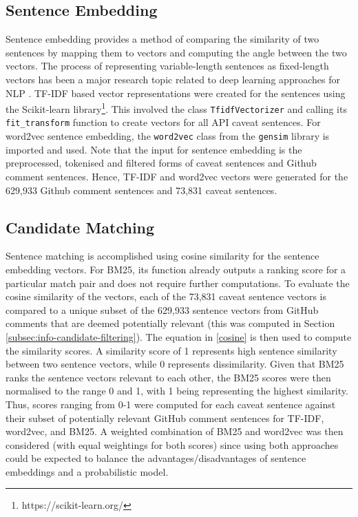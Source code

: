 \subsection{Sentence Embedding}
\label{subsec:info-sentence-embedding}
Sentence embedding provides a method of comparing the similarity of two sentences by mapping them to vectors and computing the angle between the two vectors. The process of representing variable-length sentences as fixed-length vectors has been a major research topic related to deep learning approaches for NLP \cite{adi2016fine}.
TF-IDF based vector representations were created for the sentences using the Scikit-learn library\footnote{https://scikit-learn.org/}. This involved the class \lstinline{TfidfVectorizer} and calling its \lstinline{fit_transform} function to create vectors for all API caveat sentences. For word2vec sentence embedding, the \lstinline{word2vec} class from the \lstinline{gensim} library is imported and used. Note that the input for sentence embedding is the preprocessed, tokenised and filtered forms of caveat sentences and Github comment sentences. Hence, TF-IDF and word2vec vectors were generated for the 629,933 Github comment sentences and 73,831 caveat sentences.

\subsection{Candidate Matching}
\label{subsec:info-candidate-match}
Sentence matching is accomplished using cosine similarity for the sentence embedding vectors. For BM25, its function already outputs a ranking score for a particular match pair and does not require further computations. To evaluate the cosine similarity of the vectors, each of the 73,831 caveat sentence vectors is compared to a unique subset of the 629,933 sentence vectors from GitHub comments that are deemed potentially relevant (this was computed in Section \ref{subsec:info-candidate-filtering}). The equation in \ref{cosine} is then used to compute the similarity scores. A similarity score of 1 represents high sentence similarity between two sentence vectors, while 0 represents dissimilarity. Given that BM25 ranks the sentence vectors relevant to each other, the BM25 scores were then normalised to the range 0 and 1, with 1 being representing the highest similarity. Thus, scores ranging from 0-1 were computed for each caveat sentence against their subset of potentially relevant GitHub comment sentences for TF-IDF, word2vec, and BM25. A weighted combination of BM25 and word2vec was then considered (with equal weightings for both scores) since using both approaches could be expected to balance the advantages/disadvantages of sentence embeddings and a probabilistic model. \\


